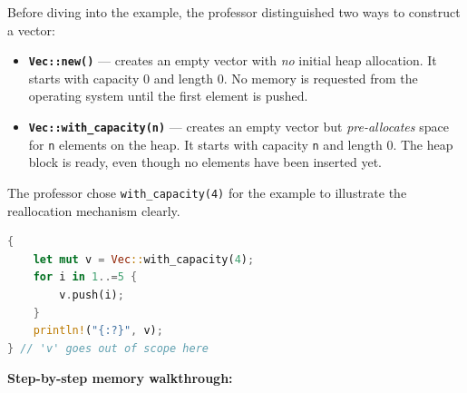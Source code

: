 Before diving into the example, the professor distinguished two ways to construct a vector:

\begin{itemize}
    \item \textbf{\texttt{Vec::new()}} --- creates an empty vector with \emph{no} initial heap allocation. It starts with capacity 0 and length 0. No memory is requested from the operating system until the first element is pushed.
    \item \textbf{\texttt{Vec::with\_capacity(n)}} --- creates an empty vector but \emph{pre-allocates} space for \texttt{n} elements on the heap. It starts with capacity \texttt{n} and length 0. The heap block is ready, even though no elements have been inserted yet.
\end{itemize}

The professor chose \texttt{with\_capacity(4)} for the example to illustrate the reallocation mechanism clearly.

\begin{lstlisting}[language=Rust]
{
    let mut v = Vec::with_capacity(4);
    for i in 1..=5 {
        v.push(i);
    }
    println!("{:?}", v);
} // 'v' goes out of scope here
\end{lstlisting}

\textbf{Step-by-step memory walkthrough:}

